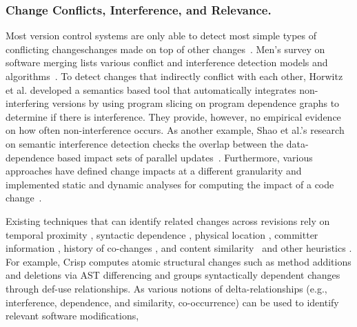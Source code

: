 \documentclass[runningheads,a4paper]{llncs}
\begin{document}
\subsubsection{Change Conflicts, Interference, and Relevance. } 
Most version control systems are only able to detect most simple types of conflicting changes\textemdash changes made on top of other changes~\cite{mens:survey02}. Men's survey on software merging lists various conflict and interference detection models and algorithms~\cite{mens:survey02}. To detect changes that indirectly conflict with each other, Horwitz et al. developed a semantics based tool that automatically integrates non-interfering versions by using program slicing on program dependence graphs to determine if there is interference. They provide, however, no empirical evidence on how often non-interference occurs. As another example, Shao et al.'s research on semantic interference detection checks the overlap between the data-dependence based impact sets of parallel updates~\cite{Shao2007:interference}.  Furthermore, various approaches have defined change impacts at a different granularity and implemented static and dynamic analyses for computing the impact of a code change~\cite{Apiwattanapong2005, Arnold1996:impact, Elbaum2001,Orso:2003, Orso2004:impact, Ren2004}.  

Existing techniques that can identify related changes across revisions rely on temporal proximity \cite{Bevan2005, Fischer2003, German2004:softchange, Zimmermann2004b}, syntactic dependence \cite{Chesley2005}, physical location \cite{Zeller1999}, committer information \cite{Fischer2003, German2004:softchange, Zimmermann2004b}, history of co-changes \cite{Gall1998, Ying2004, Zimmermann2004}, and content similarity~\cite{Kim:2009,NNP2009} and other heuristics \cite{Zeller1999}. For example, Crisp \cite{Chesley2005} computes atomic structural changes such as method additions and deletions via AST differencing and groups syntactically dependent changes through def-use relationships. As various notions of delta-relationships (e.g., interference, dependence, and similarity, co-occurrence) can be used to identify relevant software modifications,  
\end{document}
